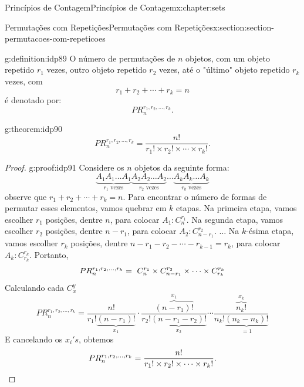 \documentclass[oneside,10pt,]{book}
\newcommand{\qedhere}{\relax}
\numberwithin{equation}{section}
\begin{document}
\begin{chapterptx}{Princípios de Contagem}{}{Princípios de Contagem}{}{}{x:chapter:sets}
\begin{sectionptx}{Permutações com Repetições}{}{Permutações com Repetições}{}{}{x:section:section-permutacoes-com-repeticoes}
\begin{definition}{}{g:definition:idp89}%
O número de permutações de \(n\) objetos, com um objeto repetido \(r_1\) vezes, outro objeto repetido \(r_2\) vezes, até o "último" objeto repetido \(r_k\) vezes, com%
\begin{equation*}
r_1+r_2+\cdots+r_k=n
\end{equation*}
é denotado por:%
\begin{equation*}
PR_n^{r_1, r_2, \ldots, r_k}. 
\end{equation*}
\end{definition}
\begin{theorem}{}{}{g:theorem:idp90}%
%
\begin{equation*}
PR_n^{r_1, r_2, \ldots, r_k} = \frac{n!}{r_1!\times r_2!\times\cdots\times r_k!}. 
\end{equation*}
%
\end{theorem}
\begin{proof}{}{g:proof:idp91}
Considere os \(n\) objetos da seguinte forma:%
\begin{equation*}
\underbrace{A_1A_1\ldots A_1}_{r_1  \text{ vezes}} \underbrace{A_2A_2\ldots A_2}_{r_2  \text{ vezes}}\ldots\underbrace{A_kA_k\ldots A_k}_{r_k  \text{ vezes}} 
\end{equation*}
observe que \(r_1+r_2+\cdots+ r_k = n.\) Para encontrar o número de formas de permutar esses elementos, vamos quebrar em \(k\) etapas. Na primeira etapa, vamos escolher \(r_1\) posições, dentre \(n\), para colocar \(A_1: C_n^{r_1}\). Na segunda etapa, vamos escolher \(r_2\) posições, dentre \(n-r_1\), para colocar \(A_2: C_{n-r_1}^{r_2}\). \(\ldots\) Na \(k\)-ésima etapa, vamos escolher \(r_k\) posições, dentre \(n-r_1-r_2-\cdots-r_{k-1}=r_k\), para colocar \(A_k: C_{r_k}^{r_k}\). Portanto,%
\begin{equation*}
PR_n^{r_1, r_2, \ldots, r_k} =~ C_n^{r_1}\times C_{n-r_1}^{r_2} \times \cdots \times C_{r_k}^{r_k} \\
\end{equation*}
Calculando cada \(C_x^y\)%
\begin{equation*}
PR_n^{r_1, r_2, \ldots, r_k} = \frac{n!}{r_1!\underbrace{(n-r_1)!}_{x_1}}\cdot\frac{\overbrace{(n-r_1)!}^{x_1}}{r_2!\underbrace{(n-r_1-r_2)!}_{x_2}}\cdots\frac{\overbrace{n_k!}^{x_k}}{n_k!\underbrace{(n_k-n_k)!}_{=1}}
\end{equation*}
E cancelando os \(x_i's\), obtemos%
\begin{equation*}
PR_n^{r_1, r_2, \ldots, r_k}= \frac{n!}{r_1!\times r_2!\times\cdots\times r_k!}.\qedhere

\end{equation*}
\end{proof}
\end{sectionptx}
\end{chapterptx}
\end{document}
